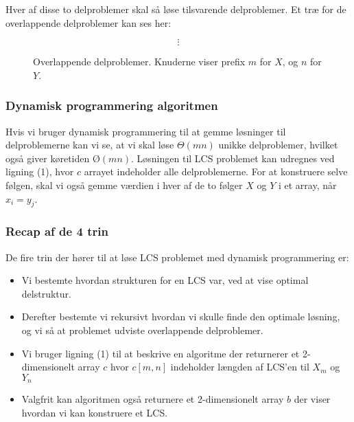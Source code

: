 Hver af disse to delproblemer skal så løse tilsvarende delproblemer. Et træ for de overlappende delproblemer kan ses her:
\begin{figure}[h!]
  \caption{Overlappende delproblemer. Knuderne viser prefix $m$ for $X$, og $n$ for $Y$.}
\begin{center}
        $$\vdots$$
\end{center}
\end{figure}

\subsubsection{Dynamisk programmering algoritmen}
Hvis vi bruger dynamisk programmering til at gemme løsninger til delproblemerne kan vi se, at vi skal løse $\Theta(mn)$ unikke delproblemer, hvilket også giver køretiden $Ø(mn)$. Løsningen til LCS problemet kan udregnes ved ligning (1), hvor $c$ arrayet indeholder alle delproblemerne. For at konstruere selve følgen, skal vi også gemme værdien i hver af de to følger $X$ og $Y$ i et array, når $x_i = y_j$.

\subsubsection{Recap af de 4 trin}
De fire trin der hører til at løse LCS problemet med dynamisk programmering er:
\begin{itemize}
\item Vi bestemte hvordan strukturen for en LCS var, ved at vise optimal delstruktur.
\item Derefter bestemte vi rekursivt hvordan vi skulle finde den optimale løsning, og vi så at problemet udviste overlappende delproblemer.
\item Vi bruger ligning (1) til at beskrive en algoritme der returnerer et 2-dimensionelt array $c$ hvor $c[m,n]$ indeholder længden af LCS'en til $X_m$ og $Y_n$\\
\item Valgfrit kan algoritmen også returnere et 2-dimensionelt array $b$ der viser hvordan vi kan konstruere et LCS.
\end{itemize}
